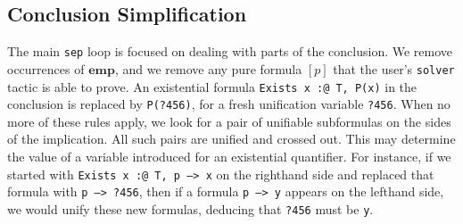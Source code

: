 \documentclass[preprint,nocopyrightspace]{sigplanconf}
\newcommand{\cd}[1]{\texttt{#1}}
\newcommand{\emp}{\mathbf{emp}}
\begin{document}
\subsection{Conclusion Simplification}

The main \cd{sep} loop is focused on dealing with parts of the conclusion.  We remove occurrences of $\emp$, and we remove any pure formula $[p]$ that the user's \cd{solver} tactic is able to prove.  An existential formula \cd{Exists x :@ T, P(x)} in the conclusion is replaced by \cd{P(?456)}, for a fresh unification variable \cd{?456}.  When no more of these rules apply, we look for a pair of unifiable subformulas on the sides of the implication.  All such pairs are unified and crossed out.  This may determine the value of a variable introduced for an existential quantifier.  For instance, if we started with \cd{Exists x :@ T, p --> x} on the righthand side and replaced that formula with \cd{p --> ?456}, then if a formula \cd{p --> y} appears on the lefthand side, we would unify these new formulas, deducing that \cd{?456} must be \cd{y}.
\end{document}
